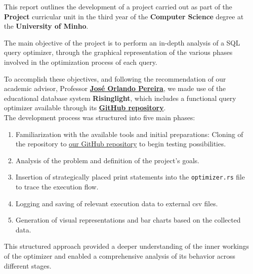 \documentclass[a4paper,12pt]{scrreprt}
\begin{document}

\makecover 
{}


\renewenvironment{abstract}
 {\par\noindent\textbf{\Large\abstractname}\par\bigskip}
 {}

\begin{abstract}
This report outlines the development of a project carried out as part of the \textbf{Project} curricular unit in the third year of the \textbf{Computer Science} degree at the \textbf{University of Minho}. 

The main objective of the project is to perform an in-depth analysis of a SQL query optimizer, through the graphical representation of the various phases involved in the optimization process of each query. 

To accomplish these objectives, and following the recommendation of our academic advisor, Professor \textbf{\href{https://jopereira.github.io}{José Orlando Pereira}}, we made use of the educational database system \textbf{Risinglight}, which includes a functional query optimizer available through its \textbf{\href{https://github.com/risinglightdb/risinglight}{GitHub repository}}. \\

The development process was structured into five main phases:
\begin{enumerate}
    \item Familiarization with the available tools and initial preparations: Cloning of the repository to \href{https://github.com/Blackparkd/risinglight}{our GitHub repository} to begin testing possibilities.
    \item Analysis of the problem and definition of the project's goals.
    \item Insertion of strategically placed print statements into the \texttt{optimizer.rs} file to trace the execution flow.
    \item Logging and saving of relevant execution data to external csv files.
    \item Generation of visual representations and bar charts based on the collected data.
\end{enumerate}

This structured approach provided a deeper understanding of the inner workings of the optimizer and enabled a comprehensive analysis of its behavior across different stages.
\end{abstract}
\end{document}
